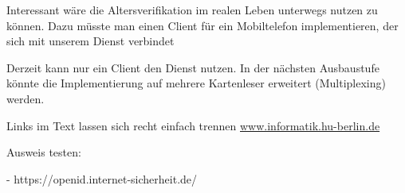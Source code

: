 \documentclass[toc=flat,fontsize=11pt,a4paper,titlepage,headsepline,numbers=noenddot, bibliography=totoc]{scrartcl}
\begin{document}
Interessant wäre die Altersverifikation im realen Leben unterwegs nutzen zu können.
Dazu müsste man einen Client für ein Mobiltelefon implementieren, der sich mit unserem Dienst verbindet
	
Derzeit kann nur ein Client den Dienst nutzen. In der nächsten Ausbaustufe könnte die Implementierung auf mehrere Kartenleser erweitert
 (Multiplexing) werden.
 
 Links im Text lassen sich recht einfach trennen
\url{www.informatik.hu-berlin.de}
\cite{TR3127}




\printbibliography

Ausweis testen:

- https://openid.internet-sicherheit.de/
\end{document}
